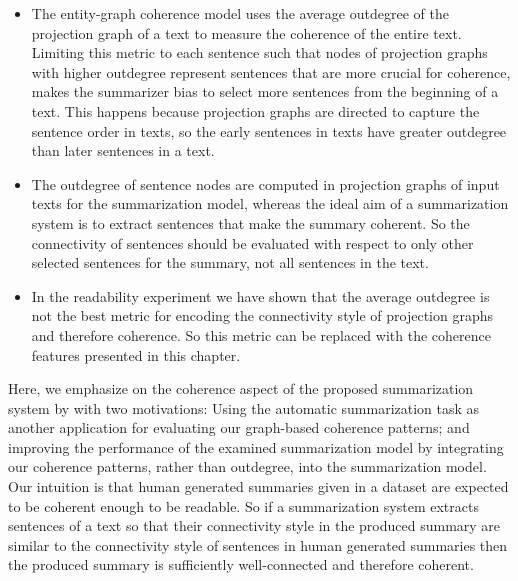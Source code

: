 \begin{itemize}
	\item 
	The entity-graph coherence model uses the average outdegree of the projection graph of a text to measure the coherence of the entire text.  
	Limiting this metric to each sentence such that nodes of projection graphs with higher outdegree represent sentences that are more crucial for coherence, makes the summarizer bias to select more sentences from the beginning of a text.  
	This happens because projection graphs are directed to capture the sentence order in texts, so the early sentences in texts have greater outdegree than later sentences in a text.  

	\item The outdegree of sentence nodes are computed in projection graphs of input texts for the summarization model,  
	whereas the ideal aim of a summarization system is to extract sentences that make the summary coherent. 
	So the connectivity of sentences should be evaluated with respect to only other selected sentences for the summary, not all sentences in the text. 


	\item In the readability experiment we have shown that the average outdegree is not the best metric for encoding the connectivity style of projection graphs and therefore coherence. 
	So this metric can be replaced with the coherence features presented in this chapter. 

\end{itemize} 

Here, we emphasize on the coherence aspect of the proposed summarization system by  with two motivations: Using the automatic summarization task as another application for evaluating our graph-based coherence patterns; and improving the performance of the examined summarization  model by integrating our coherence patterns, rather than outdegree, into the summarization model. 
Our intuition is that human generated summaries given in a dataset are expected to be coherent enough to be readable.
So if a summarization system extracts sentences of a text so that their connectivity style in the produced summary are similar to the connectivity style of sentences in human generated summaries then the produced summary is sufficiently well-connected and therefore coherent. 
 
